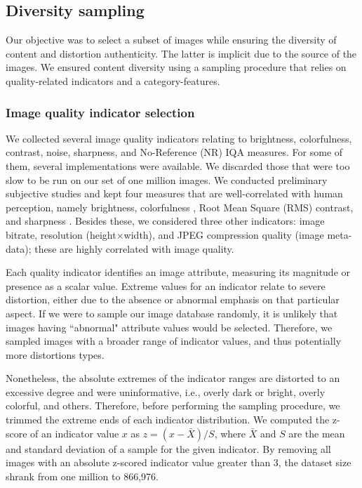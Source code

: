 \documentclass[10pt,journal,compsoc]{IEEEtran}
\begin{document}
\subsection{Diversity sampling}

Our objective was to select a subset of images while ensuring the diversity of content and distortion authenticity. The latter is implicit due to the source of the images. We ensured content diversity using a sampling procedure that relies on quality-related indicators and a category-features. 



\subsubsection{Image quality indicator selection}

We collected several image quality indicators relating to brightness, colorfulness, contrast, noise, sharpness, and No-Reference (NR) IQA measures. For some of them, several implementations were available. We discarded those that were too slow to be run on our set of one million images. We conducted preliminary subjective studies and kept four measures that are well-correlated with human perception, namely brightness, colorfulness \cite{Hasler:2003}, Root Mean Square (RMS) contrast, and sharpness \cite{Vu:2012}. Besides these, we considered three other indicators: image bitrate, resolution (height$\times$width), and JPEG compression quality (image meta-data); these are highly correlated with image quality.

Each quality indicator identifies an image attribute, measuring its magnitude or presence as a scalar value. Extreme values for an indicator relate to severe distortion, either due to the absence or abnormal emphasis on that particular aspect. If we were to sample our image database randomly, it is unlikely that images having ``abnormal" attribute values would be selected. Therefore, we sampled images with a broader range of indicator values, and thus potentially more distortions types. 

Nonetheless, the absolute extremes of the indicator ranges are distorted to an excessive degree and were uninformative, i.e., overly dark or bright, overly colorful, and others. Therefore, before performing the sampling procedure, we trimmed the extreme ends of each indicator distribution. We computed the z-score of an indicator value $x$ as $z = (x-\bar{X})/{S}$, where $\bar{X}$ and $S$ are the mean and standard deviation of a sample for the given indicator. By removing all images with an absolute z-scored indicator value greater than 3, the dataset size shrank from one million to 866,976.
\end{document}
